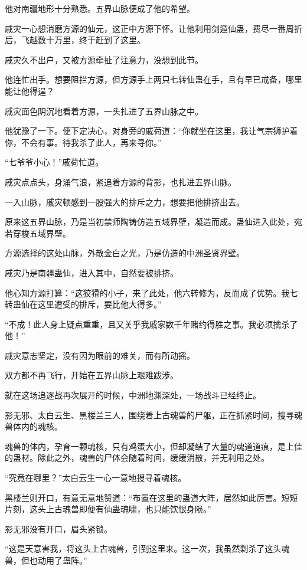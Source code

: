 \begin{this_body}
他对南疆地形十分熟悉。五界山脉便成了他的希望。

戚灾一心想消磨方源的仙元，这正中方源下怀。让他利用剑遁仙蛊，费尽一番周折后，飞越数十万里，终于赶到了这里。

戚灾久不出户，又被方源牵扯了注意力，没想到此节。

他连忙出手。想要阻拦方源，但方源手上两只七转仙蛊在手，且有早已戒备，哪里能让他得逞？

戚灾面色阴沉地看着方源，一头扎进了五界山脉之中。

他犹豫了一下。便下定决心，对身旁的戚荷道：“你就坐在这里，我让气宗狮护着你，不会有事。待我杀了此人，再来寻你。”

“七爷爷小心！”戚荷忙道。

戚灾点点头，身涌气浪，紧追着方源的背影，也扎进五界山脉。

一入山脉，戚灾顿感到一股强大的排斥之力，想要把他排挤出去。

原来这五界山脉，乃是当初禁师陶铸仿造五域界壁，凝造而成。蛊仙进入此处，宛若穿梭五域界壁。

方源选择的这处山脉，外散金白之光，乃是仿造的中洲圣贤界壁。

戚灾乃是南疆蛊仙，进入其中，自然要被排挤。

他心知方源打算：“这狡猾的小子，来了此处，他六转修为，反而成了优势。我七转蛊仙在这里遭受的排斥，要比他大得多。”

“不成！此人身上疑点重重，且又关乎我戚家数千年赌约得胜之事。我必须擒杀了他！”

戚灾意志坚定，没有因为眼前的难关，而有所动摇。

双方都不再飞行，开始在五界山脉上艰难跋涉。

就在这场追逐战再次展开的时候，中洲地渊深处，一场战斗已经终止。

影无邪、太白云生、黑楼兰三人，围绕着上古魂兽的尸躯，正在抓紧时间，搜寻魂兽体内的魂核。

魂兽的体内，孕育一颗魂核，只有鸡蛋大小，但却凝结了大量的魂道道痕，是上佳的蛊材。除此之外，魂兽的尸体会随着时间，缓缓消散，并无利用之处。

“究竟在哪里？”太白云生一心一意地搜寻着魂核。

黑楼兰则开口，有意无意地赞道：“布置在这里的蛊道大阵，居然如此厉害。短短片刻，这头上古魂兽即便有仙蛊魂啸，也只能饮恨身陨。”

影无邪没有开口，眉头紧锁。

“这是天意害我，将这头上古魂兽，引到这里来。这一次，我虽然剿杀了这头魂兽，但也动用了蛊阵。”


\end{this_body}
